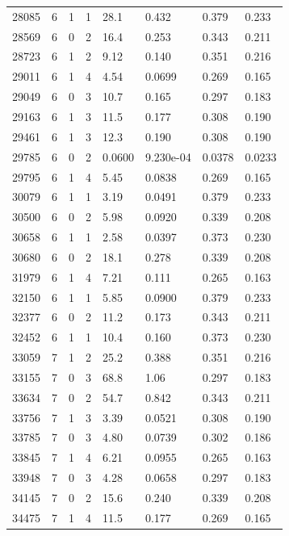 \documentclass[preview]{standalone}
\begin{document}
{{{\begin{tabular}{L{1.2cm}C{1.2cm} C{0.3cm}C{0.5cm} C{1.4cm}C{1.4cm} C{1.4cm}C{1.4cm}}
  28085  &     6  & 1     &  1 &  28.1  & 0.432  & 0.379 &  0.233   \\ 
  28569  &     6  & 0     &  2 &  16.4  & 0.253  & 0.343 &  0.211   \\ 
  28723  &     6  & 1     &  2 &  9.12  & 0.140  & 0.351 &  0.216   \\ 
  29011  &     6  & 1     &  4 &  4.54  & 0.0699  & 0.269 &  0.165   \\ 
  29049  &     6  & 0     &  3 &  10.7  & 0.165  & 0.297 &  0.183   \\ 
  29163  &     6  & 1     &  3 &  11.5  & 0.177  & 0.308 &  0.190   \\ 
  29461  &     6  & 1     &  3 &  12.3  & 0.190  & 0.308 &  0.190   \\ 
  29785  &     6  & 0     &  2 &  0.0600  & 9.230e-04  & 0.0378 &  0.0233   \\ 
  29795  &     6  & 1     &  4 &  5.45  & 0.0838  & 0.269 &  0.165   \\ 
  30079  &     6  & 1     &  1 &  3.19  & 0.0491  & 0.379 &  0.233   \\ 
  30500  &     6  & 0     &  2 &  5.98  & 0.0920  & 0.339 &  0.208   \\ 
  30658  &     6  & 1     &  1 &  2.58  & 0.0397  & 0.373 &  0.230   \\ 
  30680  &     6  & 0     &  2 &  18.1  & 0.278  & 0.339 &  0.208   \\ 
  31979  &     6  & 1     &  4 &  7.21  & 0.111  & 0.265 &  0.163   \\ 
  32150  &     6  & 1     &  1 &  5.85  & 0.0900  & 0.379 &  0.233   \\ 
  32377  &     6  & 0     &  2 &  11.2  & 0.173  & 0.343 &  0.211   \\ 
  32452  &     6  & 1     &  1 &  10.4  & 0.160  & 0.373 &  0.230   \\ 
  33059  &     7  & 1     &  2 &  25.2  & 0.388  & 0.351 &  0.216   \\ 
  33155  &     7  & 0     &  3 &  68.8  & 1.06  & 0.297 &  0.183   \\ 
  33634  &     7  & 0     &  2 &  54.7  & 0.842  & 0.343 &  0.211   \\ 
  33756  &     7  & 1     &  3 &  3.39  & 0.0521  & 0.308 &  0.190   \\ 
  33785  &     7  & 0     &  3 &  4.80  & 0.0739  & 0.302 &  0.186   \\ 
  33845  &     7  & 1     &  4 &  6.21  & 0.0955  & 0.265 &  0.163   \\ 
  33948  &     7  & 0     &  3 &  4.28  & 0.0658  & 0.297 &  0.183   \\ 
  34145  &     7  & 0     &  2 &  15.6  & 0.240  & 0.339 &  0.208   \\ 
  34475  &     7  & 1     &  4 &  11.5  & 0.177  & 0.269 &  0.165   \\ 
\hline 
\end{tabular} 

}}}
\end{document}
